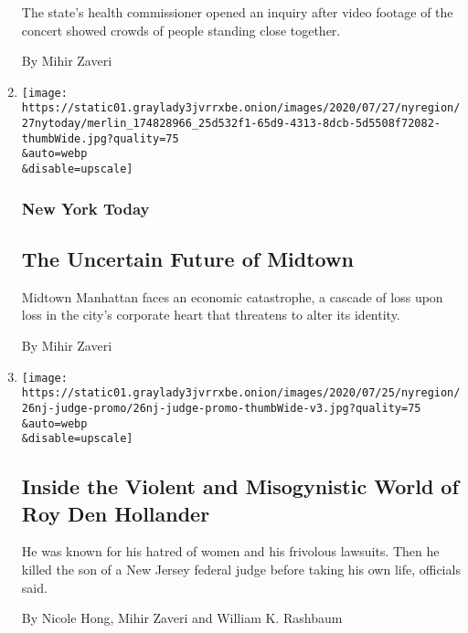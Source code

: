 \begin{enumerate}
  The state's health commissioner opened an inquiry after video footage
  of the concert showed crowds of people standing close together.

  By Mihir Zaveri
\item
  \href{/2020/07/27/nyregion/nyc-midtown-manhattan-coronavirus.html}{}

  \texttt{[image: https://static01.graylady3jvrrxbe.onion/images/2020/07/27/nyregion/27nytoday/merlin\_174828966\_25d532f1-65d9-4313-8dcb-5d5508f72082-thumbWide.jpg?quality=75\\\&auto=webp\\\&disable=upscale]}

  \hypertarget{new-york-today-1}{%
  \subsubsection{New York Today}\label{new-york-today-1}}

  \hypertarget{the-uncertain-future-of-midtown}{%
  \subsection{The Uncertain Future of
  Midtown}\label{the-uncertain-future-of-midtown}}

  Midtown Manhattan faces an economic catastrophe, a cascade of loss
  upon loss in the city's corporate heart that threatens to alter its
  identity.~

  By Mihir Zaveri
\item
  \href{/2020/07/26/nyregion/roy-den-hollander-judge.html}{}

  \texttt{[image: https://static01.graylady3jvrrxbe.onion/images/2020/07/25/nyregion/26nj-judge-promo/26nj-judge-promo-thumbWide-v3.jpg?quality=75\\\&auto=webp\\\&disable=upscale]}

  \hypertarget{inside-the-violent-and-misogynistic-world-of-roy-den-hollander}{%
  \subsection{Inside the Violent and Misogynistic World of Roy Den
  Hollander}\label{inside-the-violent-and-misogynistic-world-of-roy-den-hollander}}

  He was known for his hatred of women and his frivolous lawsuits. Then
  he killed the son of a New Jersey federal judge before taking his own
  life, officials said.

  By Nicole Hong, Mihir Zaveri and William K. Rashbaum
\end{enumerate}


